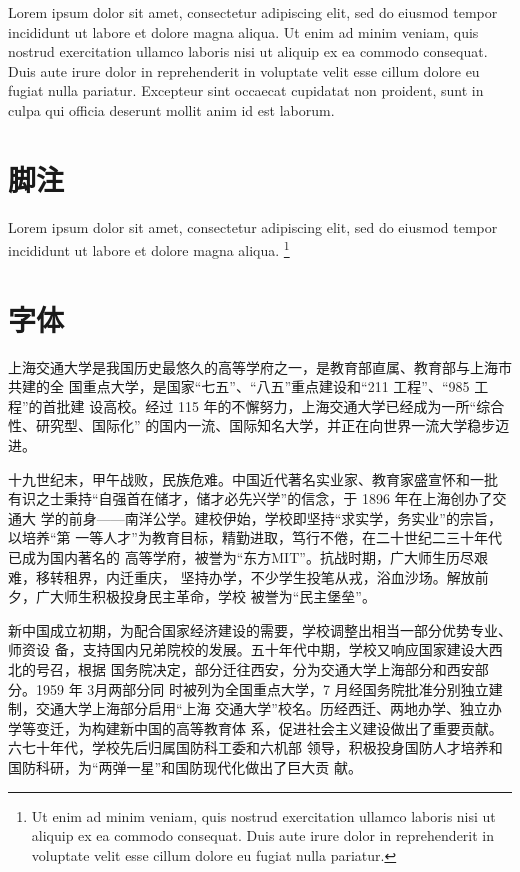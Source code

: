 \documentclass{sjtureport}
\begin{document}
Lorem ipsum dolor sit amet, consectetur adipiscing elit, sed do eiusmod tempor
incididunt ut labore et dolore magna aliqua. Ut enim ad minim veniam, quis
nostrud exercitation ullamco laboris nisi ut aliquip ex ea commodo consequat.
Duis aute irure dolor in reprehenderit in voluptate velit esse cillum dolore eu
fugiat nulla pariatur. Excepteur sint occaecat cupidatat non proident, sunt in
culpa qui officia deserunt mollit anim id est laborum.

\section{脚注}

Lorem ipsum dolor sit amet, consectetur adipiscing elit, sed do eiusmod tempor
incididunt ut labore et dolore magna aliqua. \footnote{Ut enim ad minim veniam,
quis nostrud exercitation ullamco laboris nisi ut aliquip ex ea commodo
consequat. Duis aute irure dolor in reprehenderit in voluptate velit esse cillum
dolore eu fugiat nulla pariatur.}

\section{字体}


上海交通大学是我国历史最悠久的高等学府之一，是教育部直属、教育部与上海市共建的全
国重点大学，是国家“七五”、“八五”重点建设和“211 工程”、“985 工程”的首批建
设高校。经过 115 年的不懈努力，上海交通大学已经成为一所“综合性、研究型、国际化”
的国内一流、国际知名大学，并正在向世界一流大学稳步迈进。 

{\songti 十九世纪末，甲午战败，民族危难。中国近代著名实业家、教育家盛宣怀和一批
有识之士秉持“自强首在储才，储才必先兴学”的信念，于 1896 年在上海创办了交通大
学的前身——南洋公学。建校伊始，学校即坚持“求实学，务实业”的宗旨，以培养“第
一等人才”为教育目标，精勤进取，笃行不倦，在二十世纪二三十年代已成为国内著名的
高等学府，被誉为“东方MIT”。抗战时期，广大师生历尽艰难，移转租界，内迁重庆，
坚持办学，不少学生投笔从戎，浴血沙场。解放前夕，广大师生积极投身民主革命，学校
被誉为“民主堡垒”。

新中国成立初期，为配合国家经济建设的需要，学校调整出相当一部分优势专业、师资设
备，支持国内兄弟院校的发展。五十年代中期，学校又响应国家建设大西北的号召，根据
国务院决定，部分迁往西安，分为交通大学上海部分和西安部分。1959 年 3月两部分同
时被列为全国重点大学，7 月经国务院批准分别独立建制，交通大学上海部分启用“上海
交通大学”校名。历经西迁、两地办学、独立办学等变迁，为构建新中国的高等教育体
系，促进社会主义建设做出了重要贡献。六七十年代，学校先后归属国防科工委和六机部
领导，积极投身国防人才培养和国防科研，为“两弹一星”和国防现代化做出了巨大贡
献。}
\end{document}
